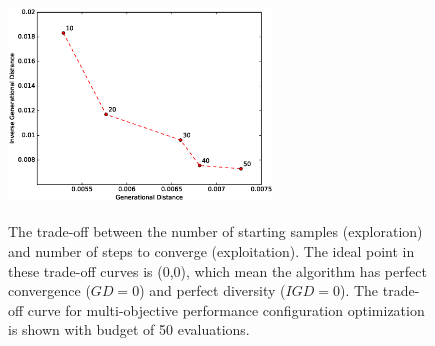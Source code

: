 \documentclass[10pt,journal,compsoc]{IEEEtran}
\begin{document}
\begin{figure}
\centering
\includegraphics[height=6cm,width=7cm]{Figures/tuning_1.eps}
\caption{The trade-off between the number of starting samples (exploration) and number of steps to converge (exploitation). The ideal point in these trade-off curves is (0,0), which mean the algorithm has perfect convergence ($GD=0$) and perfect diversity ($IGD=0$). The trade-off curve for multi-objective performance configuration optimization is shown with budget of 50 evaluations.}\label{fig:param_tuning_multiconfig}
\end{figure} 
\end{document}

